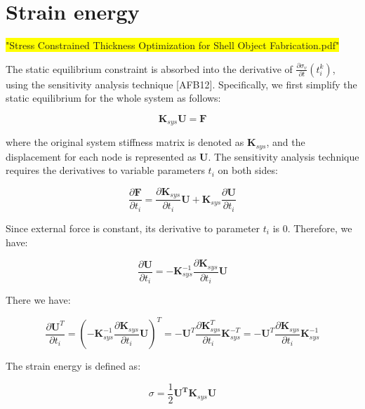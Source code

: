 
\section{Strain energy}
\colorbox{yellow}{"Stress Constrained Thickness Optimization for Shell Object Fabrication.pdf"}

The static equilibrium constraint is absorbed into the derivative of $ \frac{\partial \sigma _v}{\partial t}(t_i^k) $, using the sensitivity analysis technique [AFB12]. Specifically, we first simplify the static equilibrium for the whole system as follows:

\begin{equation*}
\mathbf{K}_{sys} \mathbf{U} = \mathbf{F}
\end{equation*}

where the original system stiffness matrix is denoted as $ \mathbf{K}_{sys} $, and the displacement for each node is represented as $ \mathbf{U} $. The sensitivity analysis technique requires the derivatives to variable parameters $ t_i $ on both sides:

\begin{equation*}
\dfrac{\partial \mathbf{F}}{\partial t_i} = \dfrac{\partial \mathbf{K}_{sys}}{\partial t_i} \mathbf{U} + \mathbf{K}_{sys} \dfrac{\partial \mathbf{U}}{\partial t_i}
\end{equation*}

Since external force is constant, its derivative to parameter $ t_i $ is 0. Therefore, we have:

\begin{equation*}
\dfrac{\partial \mathbf{U}}{\partial t_i} = -\mathbf{K}_{sys}^{-1} \dfrac{\partial \mathbf{K}_{sys}}{\partial t_i} \mathbf{U}
\end{equation*}

There we have: 

\begin{equation*}
\dfrac{\partial \mathbf{U}^T}{\partial t_i} = \left( -\mathbf{K}_{sys}^{-1} \dfrac{\partial \mathbf{K}_{sys}}{\partial t_i} \mathbf{U}\right) ^T =  -\mathbf{U}^T \dfrac{\partial \mathbf{K}_{sys}^T}{\partial t_i} \mathbf{K}_{sys}^{-T} = -\mathbf{U}^T \dfrac{\partial \mathbf{K}_{sys}}{\partial t_i} \mathbf{K}_{sys}^{-1}
\end{equation*}

The strain energy is defined as:

\begin{equation*}
\sigma = \dfrac{1}{2} \mathbf{U^T} \mathbf{K}_{sys} \mathbf{U}
\end{equation*}


